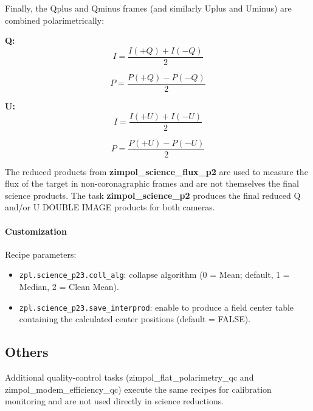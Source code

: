 Finally, the Qplus and Qminus frames (and similarly Uplus and Uminus) are combined polarimetrically:

\textbf{Q:}
\[
I = \frac{I(+Q) + I(-Q)}{2}
\]

\[
P = \frac{P(+Q) - P(-Q)}{2}
\]

\textbf{U:}
\[
I = \frac{I(+U) + I(-U)}{2}
\]

\[
P = \frac{P(+U) - P(-U)}{2}
\]

The reduced products from \textbf{zimpol\_science\_flux\_p2} are used to measure the flux of the target in non-coronagraphic frames and are not themselves the final science products.
The task \textbf{zimpol\_science\_p2} produces the final reduced Q and/or U DOUBLE IMAGE products for both cameras.

\paragraph{Customization}

Recipe parameters:
\begin{itemize}
\item \texttt{zpl.science\_p23.coll\_alg}: collapse algorithm
(0 = Mean; default, 1 = Median, 2 = Clean Mean).
\item \texttt{zpl.science\_p23.save\_interprod}: enable to produce
a field center table containing the calculated center positions
(default = FALSE).
\end{itemize}


\subsection{Others}

Additional quality-control tasks (zimpol\_flat\_polarimetry\_qc and zimpol\_modem\_efficiency\_qc) execute the same recipes for calibration monitoring and are not used directly in science reductions.